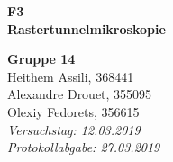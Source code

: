 


	
\begin{titlepage}
	\thispagestyle{empty}
	
%
%
%
	
	\hspace{0pt}
	\vspace{2cm}
	\begin{center}
		\hdashrule{\linewidth}{1pt}{}
		\vskip -0.5cm
		\hdashrule{\linewidth}{0.5pt}{}
		
		\vspace{0.5cm}
		\Huge{ \textbf{ F3 \\}}
		\LARGE{ \textbf{Rastertunnelmikroskopie} } 
		
		\hdashrule{\linewidth}{0.5pt}{}
		\vskip -0.95cm
		\hdashrule{\linewidth}{1pt}{}
		
		\vspace{3cm}
		\Large{\textbf{ Gruppe 14 \\}}
		\Large{Heithem Assili, 368441 \\ Alexandre Drouet, 355095 \\ Olexiy Fedorets, 356615 \\}
		\vspace{1cm}
		\Large{\textsl{ Versuchstag: 12.03.2019 \\ Protokollabgabe: 27.03.2019}}
		
	\end{center}
	\vfill
	
\end{titlepage}
	
	
	
{}
\thispagestyle{plain}

